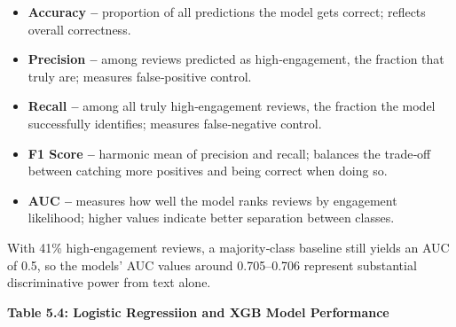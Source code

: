 \documentclass[
]{article}
\begin{document}
\begin{itemize}

\item \textbf{Accuracy -- } proportion of all predictions the model gets correct; reflects overall correctness.

\item \textbf{Precision --} among reviews predicted as high‑engagement, the fraction that truly are; measures false‑positive control.

\item \textbf{Recall -- } among all truly high‑engagement reviews, the fraction the model successfully identifies; measures false‑negative control.

\item \textbf{F1 Score -- } harmonic mean of precision and recall; balances the trade‑off between catching more positives and being correct when doing so.

\item \textbf{AUC -- } measures how well the model ranks reviews by engagement likelihood; higher values indicate better separation between classes.

\end{itemize}

With 41\% high‑engagement reviews, a majority‑class baseline still
yields an AUC of 0.5, so the models' AUC values around 0.705--0.706
represent substantial discriminative power from text alone.

\textbf{Table 5.4: Logistic Regressiion and XGB Model Performance}
\end{document}
